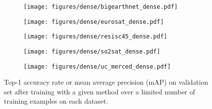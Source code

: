 \begin{figure}[tb]
     \centering
     \begin{subfigure}[b]{0.3\textwidth}
         \centering
         \texttt{[image: figures/dense/bigearthnet\_dense.pdf]}
         \caption{\bigearthnet{}}
         \label{fig:dense bigearthnet}
     \end{subfigure}
     \quad
     \begin{subfigure}[b]{0.3\textwidth}
         \centering
         \texttt{[image: figures/dense/eurosat\_dense.pdf]}
         \caption{\eurosat{}}
         \label{fig:dense eurosat}
     \end{subfigure}
     \quad
     \begin{subfigure}[b]{0.3\textwidth}
         \centering
         \texttt{[image: figures/dense/resisc45\_dense.pdf]}
         \caption{\resisc{}}
         \label{fig:dense resisc45}
     \end{subfigure}

    \medskip
     \centering
     \begin{subfigure}[b]{0.3\textwidth}
         \centering
         \texttt{[image: figures/dense/so2sat\_dense.pdf]}
         \caption{\sosat{}}
         \label{fig:dense so2sat}
     \end{subfigure}
     \quad
     \begin{subfigure}[b]{0.3\textwidth}
         \centering
         \texttt{[image: figures/dense/uc\_merced\_dense.pdf]}
         \caption{\ucmerced{}}
         \label{fig:dense uc_merced}
     \end{subfigure}
     \quad
     \begin{subfigure}[b]{0.3\textwidth}
        \centering
     \end{subfigure}

    \caption{Top-1 accuracy rate or mean average precision (mAP) on validation set after training with a given method over a limited number of training examples on each dataset.}
\label{fig:dense}
\end{figure}
 
















